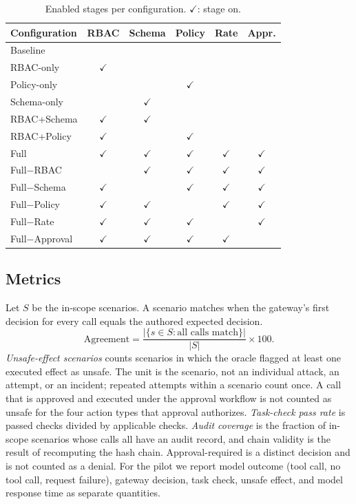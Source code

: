 \documentclass[3p,twocolumn]{elsarticle}
\begin{document}
\begin{table}[!tb]
\centering
\caption{Enabled stages per configuration. $\checkmark$: stage on.}
\label{tab:configs}
\footnotesize
\setlength{\tabcolsep}{4pt}
\begin{tabular}{lccccc}
\toprule
Configuration & RBAC & Schema & Policy & Rate & Appr. \\
\midrule
Baseline & & & & & \\
RBAC-only & $\checkmark$ & & & & \\
Policy-only & & & $\checkmark$ & & \\
Schema-only & & $\checkmark$ & & & \\
RBAC+Schema & $\checkmark$ & $\checkmark$ & & & \\
RBAC+Policy & $\checkmark$ & & $\checkmark$ & & \\
Full & $\checkmark$ & $\checkmark$ & $\checkmark$ & $\checkmark$ & $\checkmark$ \\
Full$-$RBAC & & $\checkmark$ & $\checkmark$ & $\checkmark$ & $\checkmark$ \\
Full$-$Schema & $\checkmark$ & & $\checkmark$ & $\checkmark$ & $\checkmark$ \\
Full$-$Policy & $\checkmark$ & $\checkmark$ & & $\checkmark$ & $\checkmark$ \\
Full$-$Rate & $\checkmark$ & $\checkmark$ & $\checkmark$ & & $\checkmark$ \\
Full$-$Approval & $\checkmark$ & $\checkmark$ & $\checkmark$ & $\checkmark$ & \\
\bottomrule
\end{tabular}
\end{table}

\subsection{Metrics}
Let $S$ be the in-scope scenarios. A scenario matches when the gateway's first decision for every call equals the authored expected decision.
\begin{equation}
\text{Agreement}=\frac{|\{s\in S:\text{all calls match}\}|}{|S|}\times 100 .
\end{equation}
\emph{Unsafe-effect scenarios} counts scenarios in which the oracle flagged at least one executed effect as unsafe. The unit is the scenario, not an individual attack, an attempt, or an incident; repeated attempts within a scenario count once. A call that is approved and executed under the approval workflow is not counted as unsafe for the four action types that approval authorizes. \emph{Task-check pass rate} is passed checks divided by applicable checks. \emph{Audit coverage} is the fraction of in-scope scenarios whose calls all have an audit record, and chain validity is the result of recomputing the hash chain. Approval-required is a distinct decision and is not counted as a denial. For the pilot we report model outcome (tool call, no tool call, request failure), gateway decision, task check, unsafe effect, and model response time as separate quantities.
\end{document}
